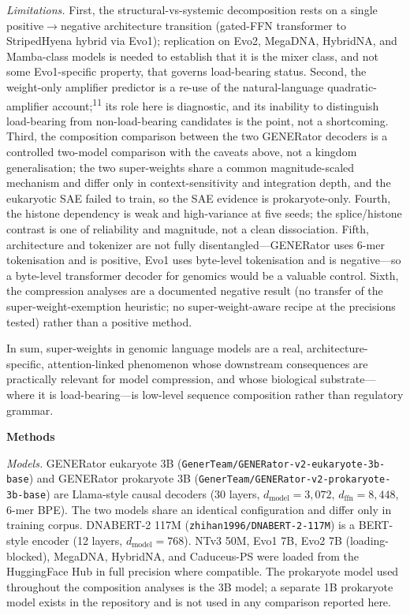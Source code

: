 \documentclass[11pt]{article}
\begin{document}
\textit{Limitations.} First, the structural-vs-systemic decomposition
rests on a single positive$\rightarrow$negative architecture transition
(gated-FFN transformer to StripedHyena hybrid via Evo1); replication on
Evo2, MegaDNA, HybridNA, and Mamba-class models is needed to establish
that it is the mixer class, and not some Evo1-specific property, that
governs load-bearing status. Second, the weight-only amplifier predictor
is a re-use of the natural-language quadratic-amplifier
account;\textsuperscript{11} its role here is diagnostic, and its
inability to distinguish load-bearing from non-load-bearing candidates
is the point, not a shortcoming. Third, the composition comparison
between the two GENERator decoders is a controlled two-model comparison
with the caveats above, not a kingdom generalisation; the two
super-weights share a common magnitude-scaled mechanism and differ only
in context-sensitivity and integration depth, and the eukaryotic SAE
failed to train, so the SAE evidence is prokaryote-only. Fourth, the histone dependency is weak
and high-variance at five seeds; the splice/histone contrast is one of
reliability and magnitude, not a clean dissociation. Fifth, architecture
and tokenizer are not fully disentangled---GENERator uses 6-mer
tokenisation and is positive, Evo1 uses byte-level tokenisation and is
negative---so a byte-level transformer decoder for genomics would be a
valuable control. Sixth, the compression analyses are a documented
negative result (no transfer of the super-weight-exemption heuristic;
no super-weight-aware recipe at the precisions tested) rather than a
positive method.

In sum, super-weights in genomic language models are a real,
architecture-specific, attention-linked phenomenon whose downstream
consequences are practically relevant for model compression, and whose
biological substrate---where it is load-bearing---is low-level sequence
composition rather than regulatory grammar.

\textbf{Methods}

\textit{Models.}
GENERator eukaryote 3B
(\texttt{GenerTeam/GENERator-v2-eukaryote-3b-base}) and GENERator
prokaryote 3B (\texttt{GenerTeam/GENERator-v2-prokaryote-3b-base}) are
Llama-style causal decoders (30 layers, $d_{\text{model}}=3{,}072$,
$d_{\text{ffn}}=8{,}448$, 6-mer BPE). The two models share an identical
configuration and differ only in training corpus. DNABERT-2 117M
(\texttt{zhihan1996/DNABERT-2-117M}) is a BERT-style encoder (12 layers,
$d_{\text{model}}=768$). NTv3 50M, Evo1 7B, Evo2 7B (loading-blocked),
MegaDNA, HybridNA, and Caduceus-PS were loaded from the HuggingFace Hub
in full precision where compatible. The prokaryote model used throughout
the composition analyses is the 3B model; a separate 1B prokaryote model
exists in the repository and is not used in any comparison reported here.
\end{document}
